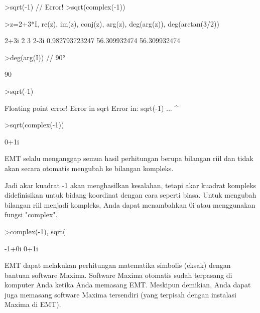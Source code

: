 \documentclass[a4paper,10pt]{article}
\begin{document}
\begin{eulernotebook}
\begin{eulercomment}
\begin{eulercomment}
\begin{eulercomment}
\begin{eulercomment}
\begin{eulercomment}
\end{eulercomment}
\begin{eulerttcomment}
  >sqrt(-1) // Error!
  >sqrt(complex(-1))
\end{eulerttcomment}
\begin{eulerprompt}
>z=2+3*I, re(z), im(z), conj(z), arg(z), deg(arg(z)), deg(arctan(3/2))
\end{eulerprompt}
\begin{euleroutput}
  2+3i
  2
  3
  2-3i
  0.982793723247
  56.309932474
  56.309932474
\end{euleroutput}
\begin{eulerprompt}
>deg(arg(I)) // 90°
\end{eulerprompt}
\begin{euleroutput}
  90
\end{euleroutput}
\begin{eulerprompt}
>sqrt(-1)
\end{eulerprompt}
\begin{euleroutput}
  Floating point error!
  Error in sqrt
  Error in:
  sqrt(-1) ...
          ^
\end{euleroutput}
\begin{eulerprompt}
>sqrt(complex(-1))
\end{eulerprompt}
\begin{euleroutput}
  0+1i
\end{euleroutput}
\begin{eulercomment}
EMT selalu menganggap semua hasil perhitungan berupa bilangan riil dan tidak
akan secara otomatis mengubah ke bilangan kompleks.

Jadi akar kuadrat -1 akan menghasilkan kesalahan, tetapi akar kuadrat kompleks
didefinisikan untuk bidang koordinat dengan cara seperti biasa. Untuk mengubah
bilangan riil menjadi kompleks, Anda dapat menambahkan 0i atau menggunakan
fungsi "complex".
\end{eulercomment}
\begin{eulerprompt}
>complex(-1), sqrt(%
\end{eulerprompt}
\begin{euleroutput}
  -1+0i 
  0+1i
\end{euleroutput}
\begin{eulercomment}
EMT dapat melakukan perhitungan matematika simbolis (eksak) dengan bantuan
software Maxima. Software Maxima otomatis sudah terpasang di komputer Anda ketika
Anda memasang EMT. Meskipun demikian, Anda dapat juga memasang software Maxima
tersendiri (yang terpisah dengan instalasi Maxima di EMT).


\end{eulercomment}
\end{eulercomment}
\end{eulercomment}
\end{eulercomment}
\end{eulercomment}
\end{eulernotebook}
\end{document}
